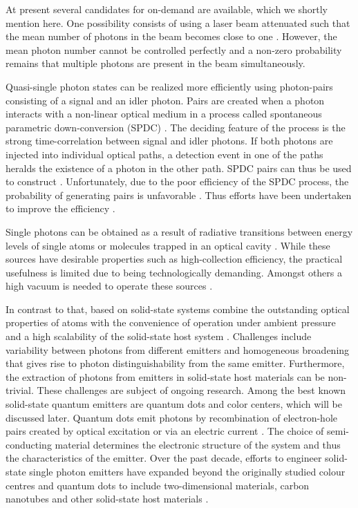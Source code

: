	At present several candidates for on-demand \spss are available, which we shortly mention here. One possibility consists of using a laser beam attenuated such that the mean number of photons in the beam becomes close to one \cite{gisin2002quantum, eisaman2011invited, migdall2013single}. However, the mean photon number cannot be controlled perfectly and a non-zero probability remains that multiple photons are present in the beam simultaneously.

	Quasi-single photon states can be realized more efficiently using photon-pairs consisting of a signal and an idler photon. Pairs are created when a photon interacts with a non-linear optical medium in a process called spontaneous parametric down-conversion (SPDC) \cite{shih2003entangled, klyshko1977utilization, fasel2004high, ware2004single, brida2012extremely,SiquteProject}. The deciding feature of the process is the strong time-correlation between signal and idler photons. If both photons are injected into individual optical paths, a detection event in one of the paths heralds the existence of a photon in the other path. SPDC pairs can thus be used to construct \spss. Unfortunately, due to the poor efficiency of the SPDC process, the probability of generating pairs is unfavorable \cite{zwinkels2010photometry, Bock2016}. Thus efforts have been undertaken to improve the efficiency \cite{Bock2016, vrehavcek2003multiple, brida2008experimental}.

	Single photons can be obtained as a result of radiative transitions between energy levels of single atoms or molecules trapped in an optical cavity \cite{Kuhn2002}. While these sources have desirable properties such as high-collection efficiency, the practical usefulness is limited due to being technologically demanding. Amongst others a high vacuum is needed to operate these sources \cite{zwinkels2010photometry}.

	In contrast to that, \spss based on solid-state systems combine the outstanding optical properties of atoms with the convenience of operation under ambient pressure and a high scalability of the solid-state host system \cite{loredo2016scalable,somaschi2016near,Aharonovich2016}.
	Challenges include variability between photons from different emitters and homogeneous \lw broadening that gives rise to photon distinguishability from the same emitter. 
	Furthermore, the extraction of photons from emitters in solid-state host materials can be non-trivial.
	These challenges are subject of ongoing research.
	Among the best known solid-state quantum emitters are quantum dots and color centers, which will be discussed later.
	Quantum dots emit photons by recombination of electron-hole pairs created by optical excitation or via an electric current \cite{Yuan2002, buckley2012engineered}. The choice of semi-conducting material determines the electronic structure of the system and thus the characteristics of the emitter.
	Over the past decade, efforts to engineer solid-state single photon emitters have expanded beyond the originally studied colour centres and quantum dots to include two-dimensional materials, carbon nanotubes and other solid-state host materials \cite{Aharonovich2016}.

